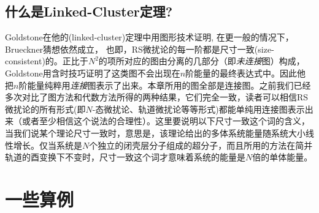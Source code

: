 \subsection{什么是Linked-Cluster定理?}
Goldstone在他的(linked-cluster)定理中用图形技术证明, 在更一般的情况下，Brueckner猜想依然成立， 也即，RS微扰论的每一阶都是尺寸一致(size-consistent)的。正比于$N^2$的项所对应的图由分离的几部分（即\emph{未连接}图）构成， Goldstone用含时技巧证明了这类图不会出现在$n$阶能量的最终表达式中。因此他把$n$阶能量纯粹用\emph{连接}图表示了出来。本章所用的图全部是连接图。之前我们已经多次对比了图方法和代数方法所得的两种结果，它们完全一致，读者可以相信RS微扰论的所有形式(即$N$-态微扰论、轨道微扰论等等形式)都能单纯用连接图表示出来（或者至少相信这个说法的合理性）。这里要说明以下尺寸一致这个词的含义，当我们说某个理论尺寸一致时，意思是，该理论给出的多体系统能量随系统大小线性增长。仅当系统是$N$个独立的闭壳层分子组成的超分子，而且所用的方法在简并轨道的酉变换下不变时，尺寸一致这个词才意味着系统的能量是$N$倍的单体能量。
\section{一些算例}